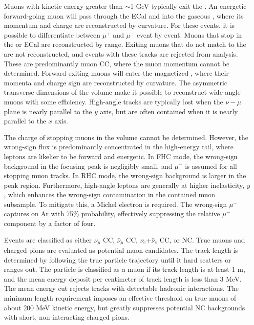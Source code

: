 Muons with kinetic energy greater than $\sim$1 GeV typically exit the . An energetic forward-going muon will pass through the ECal and into the gaseous , where its momentum and charge are reconstructed by curvature. For these events, it is possible to differentiate between $\mu^{+}$ and $\mu^{-}$ event by event. Muons that stop in the  or ECal are reconstructed by range. Exiting muons that do not match to the   are not reconstructed, and events with these tracks are rejected from analysis.
These are predominantly muon CC, where the muon momentum cannot be determined. Forward exiting muons will enter the magnetized , where their momenta and charge sign are reconstructed by curvature. The asymmetric transverse dimensions of the  volume make it possible to reconstruct wide-angle muons with some efficiency. High-angle tracks are typically lost when the $\nu-\mu$ plane is nearly parallel to the $y$ axis, but are often contained when it is nearly parallel to the $x$ axis. 

The charge of stopping muons in the  volume cannot be determined. However, the wrong-sign flux is predominantly concentrated in the high-energy tail, where leptons are likelier to be forward and energetic. In FHC mode, the wrong-sign background in the focusing peak is negligibly small, and $\mu^{-}$ is assumed for all stopping muon tracks. In RHC mode, the wrong-sign background is larger in the peak region. Furthermore, high-angle leptons are generally at higher inelasticity, $y$, which enhances the wrong-sign contamination in the contained muon subsample. To mitigate this, a Michel electron is required. The wrong-sign $\mu^{-}$ captures on Ar with 75\% probability, effectively suppressing the relative $\mu^{-}$ component by a factor of four.

Events are classified as either $\nu_{\mu}$ CC, $\bar{\nu}_{\mu}$ CC, $\nu_{e}$+$\bar{\nu}_{e}$ CC, or NC. True muons and charged pions are evaluated as potential muon candidates. The track length is determined by following the true particle trajectory until it hard scatters or ranges out. The particle is classified as a muon if its track length is at least 1 m, and the mean energy deposit per centimeter of track length is less than 3 MeV. The mean energy cut rejects tracks with detectable hadronic interactions. The minimum length requirement imposes an effective threshold on true muons of about 200 MeV kinetic energy, but greatly suppresses potential NC backgrounds with short, non-interacting charged pions.

